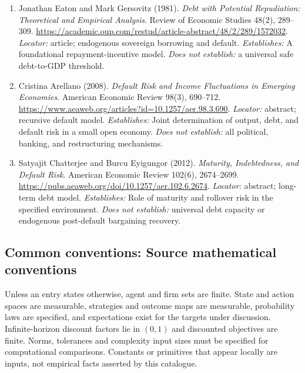 \documentclass[11pt,a4paper]{article}
\begin{document}
\begin{enumerate}

\item[S1] Jonathan Eaton and Mark Gersovitz (1981). \emph{Debt with Potential Repudiation: Theoretical and Empirical Analysis}. Review of Economic Studies 48(2), 289--309. \url{https://academic.oup.com/restud/article-abstract/48/2/289/1572032}. \textit{Locator:} article; endogenous sovereign borrowing and default. \textit{Establishes:} A foundational repayment-incentive model. \textit{Does not establish:} a universal safe debt-to-GDP threshold.

\item[S2] Cristina Arellano (2008). \emph{Default Risk and Income Fluctuations in Emerging Economies}. American Economic Review 98(3), 690--712. \url{https://www.aeaweb.org/articles?id=10.1257/aer.98.3.690}. \textit{Locator:} abstract; recursive default model. \textit{Establishes:} Joint determination of output, debt, and default risk in a small open economy. \textit{Does not establish:} all political, banking, and restructuring mechanisms.

\item[S3] Satyajit Chatterjee and Burcu Eyigungor (2012). \emph{Maturity, Indebtedness, and Default Risk}. American Economic Review 102(6), 2674--2699. \url{https://pubs.aeaweb.org/doi/10.1257/aer.102.6.2674}. \textit{Locator:} abstract; long-term debt model. \textit{Establishes:} Role of maturity and rollover risk in the specified environment. \textit{Does not establish:} universal debt capacity or endogenous post-default bargaining recovery.

\end{enumerate}

\subsection*{Common conventions: Source mathematical conventions}

Unless an entry states otherwise, agent and firm sets are finite. State and action spaces are measurable, strategies and outcome maps are measurable, probability laws are specified, and expectations exist for the targets under discussion. Infinite-horizon discount factors lie in $(0,1)$ and discounted objectives are finite. Norms, tolerances and complexity input sizes must be specified for computational comparisons. Constants or primitives that appear locally are inputs, not empirical facts asserted by this catalogue.
\end{document}
